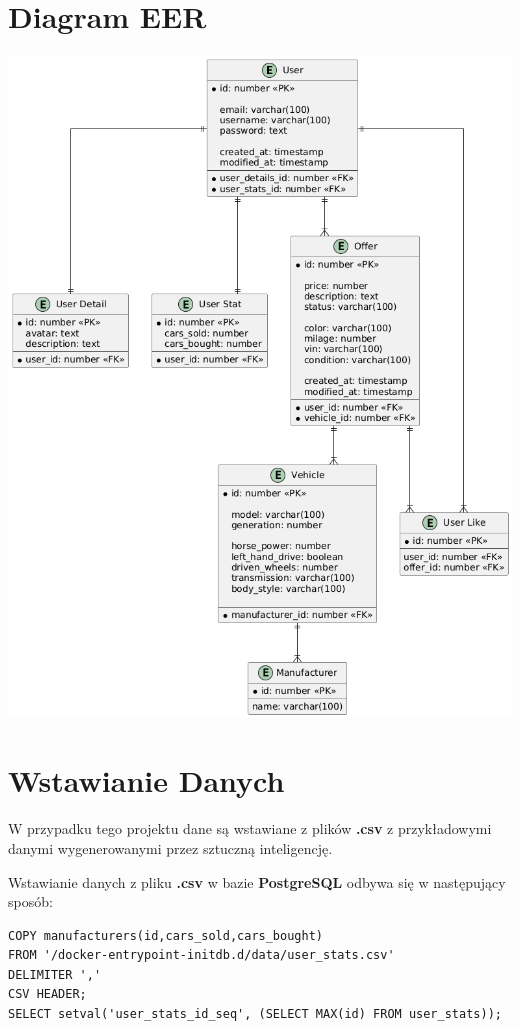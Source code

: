 \documentclass[a4paper,11pt]{article}
\begin{document}
\section*{Diagram EER}
\includegraphics[width=\textwidth]{database.png}
\pagebreak

\section*{Wstawianie Danych}
W przypadku tego projektu dane są wstawiane z plików \textbf{.csv} z przykładowymi danymi wygenerowanymi przez sztuczną inteligencję.
\linebreak

Wstawianie danych z pliku \textbf{.csv} w bazie \textbf{PostgreSQL} odbywa się w następujący sposób:

\begin{verbatim}
COPY manufacturers(id,cars_sold,cars_bought)
FROM '/docker-entrypoint-initdb.d/data/user_stats.csv'
DELIMITER ','
CSV HEADER;
SELECT setval('user_stats_id_seq', (SELECT MAX(id) FROM user_stats));
\end{verbatim}
\end{document}
